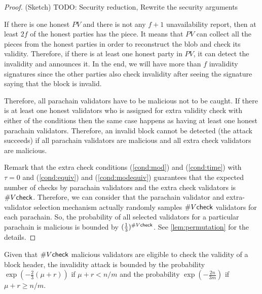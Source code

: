 \begin{proof}(Sketch)
TODO: Security reduction, Rewrite the security arguments


If there is one honest $PV$ and there is not any $f+1$ unavailability report, then at least $2f$ of the honest parties has the piece. It means that $PV$ can collect all the pieces from the honest parties in order to reconstruct the blob and check its validity. Therefore, if there is at least one honest party in $PV$, it can detect the invalidity and announces it. In the end, we will have more than $f$ invalidity signatures since the other parties also check invalidity after seeing the signature saying that the block is invalid.

Therefore, all parachain validators have to be malicious not to be caught. 
If there is at least one honest validators who is assigned for extra validity check with either of the conditions then the same case happens as having at least one honest parachain validators. Therefore, an invalid block cannot be detected (the attack succeeds) if all parachain validators are malicious and all extra check validators are malicious. 

Remark that the extra check conditions (\ref{cond:mod}) and (\ref{cond:time})  with $\tau = 0$ and (\ref{cond:equiv}) and (\ref{cond:modequiv}) guarantees that the expected number of checks by parachain validators and the extra check validators is $\#V\mathsf{check}$. %
Therefore, we can consider that the parachain validator and extra-validator selection mechanism actually randomly samples $\#V\mathsf{check}$ validators for each parachain. So, the probability of all selected validators for a particular parachain is malicious is bounded by $(\frac{1}{3})^{\#V\mathsf{check}}$. See \ref{lem:permutation} for the details.

\end{proof}



\begin{theorem}\label{thm:vcheckmal}
Given that $\#V\mathsf{check}$ malicious validators are eligible to check the validity of a block header, the invalidity attack is bounded by the probability  $\exp(-\frac{2}{3}(\mu+r))$ if $\mu + r < n/m$ and the probability $\exp(-\frac{2n}{3m})$ if $\mu + r \geq n/m$.
\end{theorem}


